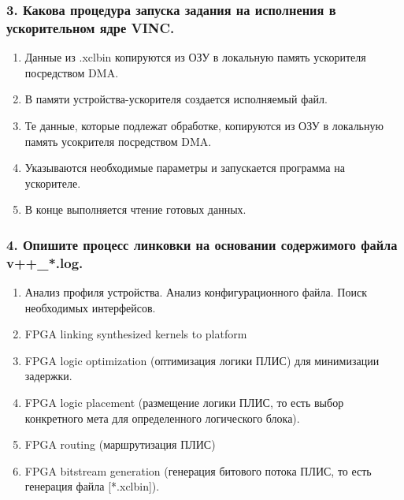 \subsubsection{3. Какова процедура запуска задания на исполнения в ускорительном ядре VINC.}

\begin{enumerate}
	\item Данные из .xclbin копируются из ОЗУ в локальную память ускорителя посредством DMA.
	\item В памяти устройства-ускорителя создается исполняемый файл.
	\item Те данные, которые подлежат обработке, копируются из ОЗУ в локальную память усокрителя посредством DMA.
	\item Указываются необходимые параметры и запускается программа на ускорителе.
	\item В конце выполняется чтение готовых данных. 
\end{enumerate}

\subsubsection{4. Опишите процесс линковки на основании содержимого файла v++\_*.log.}

\begin{enumerate}
	\item Анализ профиля устройства. Анализ конфигурационного файла. Поиск необходимых интерфейсов.
	\item FPGA linking synthesized kernels to platform
	\item FPGA logic optimization (оптимизация логики ПЛИС) для минимизации задержки.
	\item FPGA logic placement (размещение логики ПЛИС, то есть выбор конкретного мета для определенного логического блока). 
	\item FPGA routing (маршрутизация ПЛИС)
	\item FPGA bitstream generation (генерация битового потока ПЛИС, то есть генерация файла  [*.xclbin]).
\end{enumerate}